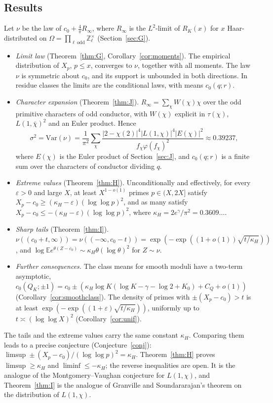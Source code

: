 \documentclass[11pt]{amsart}
\theoremstyle{remark}
\newcommand{\E}{\mathbb{E}}
\newcommand{\Z}{\mathbb{Z}}
\begin{document}
\subsection*{Results}
Let $\nu$ be the law of $c_0+\frac4\pi R_\infty$, where $R_\infty$ is the $L^2$-limit of $R_K(x)$ for $x$ Haar-distributed on $\Omega=\prod_{\ell\ \mathrm{odd}}\Z_\ell^\times$ (Section~\ref{sec:G}).
\begin{itemize}
\item \emph{Limit law} (Theorem~\ref{thm:G}, Corollary~\ref{cor:moments}). The empirical distribution of $X_p$, $p\le x$, converges to $\nu$, together with all moments. The law $\nu$ is symmetric about $c_0$, and its support is unbounded in both directions. In residue classes the limits are the conditional laws, with means $c_0(q;r)$.
\item \emph{Character expansion} (Theorem~\ref{thm:J}). $R_\infty=\sum_\chi W(\chi)\chi$ over the odd primitive characters of odd conductor, with $W(\chi)$ explicit in $\tau(\chi)$, $L(1,\bar\chi)^2$ and an Euler product. Hence
\[
\sigma^2=\mathrm{Var}(\nu)=\frac1{\pi^2}\sum_\chi\frac{|2-\chi(2)|^4|L(1,\chi)|^4|E(\chi)|^2}{f_\chi\varphi(f_\chi)^2}\approx0.39237,
\]
where $E(\chi)$ is the Euler product of Section~\ref{sec:J}, and $c_0(q;r)$ is a finite sum over the characters of conductor dividing $q$.
\item \emph{Extreme values} (Theorem~\ref{thm:H}). Unconditionally and effectively, for every $\varepsilon>0$ and large $X$, at least $X^{1-o(1)}$ primes $p\in(X,2X]$ satisfy $X_p-c_0\ge(\kappa_H-\varepsilon)(\log\log p)^2$, and as many satisfy $X_p-c_0\le-(\kappa_H-\varepsilon)(\log\log p)^2$, where $\kappa_H=2e^\gamma/\pi^2=0.3609\ldots$.
\item \emph{Sharp tails} (Theorem~\ref{thm:I}). $\nu((c_0+t,\infty))=\nu((-\infty,c_0-t))=\exp(-\exp((1+o(1))\sqrt{t/\kappa_H}))$, and $\log\E e^{\theta(Z-c_0)}\sim\kappa_H\theta(\log\theta)^2$ for $Z\sim\nu$.
\item \emph{Further consequences.} The class means for smooth moduli have a two-term asymptotic, $c_0(Q_K;\pm1)=c_0\pm(\kappa_H\log K(\log K-\gamma-\log2+K_0)+C_Q+o(1))$ (Corollary~\ref{cor:smoothclass}). The density of primes with $\pm(X_p-c_0)>t$ is at least $\exp(-\exp((1+\varepsilon)\sqrt{t/\kappa_H}))$, uniformly up to $t\asymp(\log\log X)^2$ (Corollary~\ref{cor:unif}).
\end{itemize}
The tails and the extreme values carry the same constant $\kappa_H$. Comparing them leads to a precise conjecture (Conjecture~\ref{conj}): $\limsup\pm(X_p-c_0)/(\log\log p)^2=\kappa_H$. Theorem~\ref{thm:H} proves $\limsup\ge\kappa_H$ and $\liminf\le-\kappa_H$; the reverse inequalities are open. It is the analogue of the Montgomery--Vaughan conjecture for $L(1,\chi)$, and Theorem~\ref{thm:I} is the analogue of Granville and Soundararajan's theorem on the distribution of $L(1,\chi)$.
\end{document}
